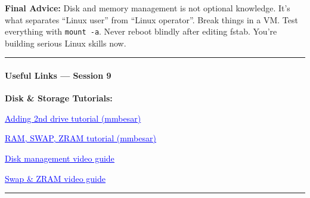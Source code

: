 \documentclass[
  english,
  paper=a4,
  oneside  ,captions=tableheading
]{scrartcl}
\renewenvironment{quote}{\begin{customblockquote}\list{}{\rightmargin=0em\leftmargin=0em}%
\item\relax\color{blockquote-text}\ignorespaces}{\unskip\unskip\endlist\end{customblockquote}}
\begin{document}
\begin{quote}
\textbf{Final Advice:} Disk and memory management is not optional
knowledge. It's what separates ``Linux user'' from ``Linux operator''.
Break things in a VM. Test everything with \texttt{mount\ -a}. Never
reboot blindly after editing fstab. You're building serious Linux skills
now.
\end{quote}

\begin{center}\rule{0.5\linewidth}{0.5pt}\end{center}

\paragraph{Useful Links --- Session 9}\label{useful-links-session-9}

\textbf{Disk \& Storage Tutorials:}

%
  \par\vspace{0.5ex}%
  \href{https://mmbesar.github.io/Tutorials/2nd-drive/}{\textcolor{blue}{\underline{\faLink\quad Adding 2nd drive tutorial (mmbesar)}}}%
  \par\vspace{0.5ex}%

%
  \par\vspace{0.5ex}%
  \href{https://mmbesar.github.io/Tutorials/RAM-SWAP-ZRAM/}{\textcolor{blue}{\underline{\faLink\quad RAM, SWAP, ZRAM tutorial (mmbesar)}}}%
  \par\vspace{0.5ex}%

%
  \par\vspace{0.5ex}%
  \href{https://www.youtube.com/watch?v=yWuHI7uoftY}{\textcolor{blue}{\underline{\faLink\quad Disk management video guide}}}%
  \par\vspace{0.5ex}%

%
  \par\vspace{0.5ex}%
  \href{https://youtu.be/CPvJvY79vEw}{\textcolor{blue}{\underline{\faLink\quad Swap \& ZRAM video guide}}}%
  \par\vspace{0.5ex}%

\begin{center}\rule{0.5\linewidth}{0.5pt}\end{center}
\end{document}
